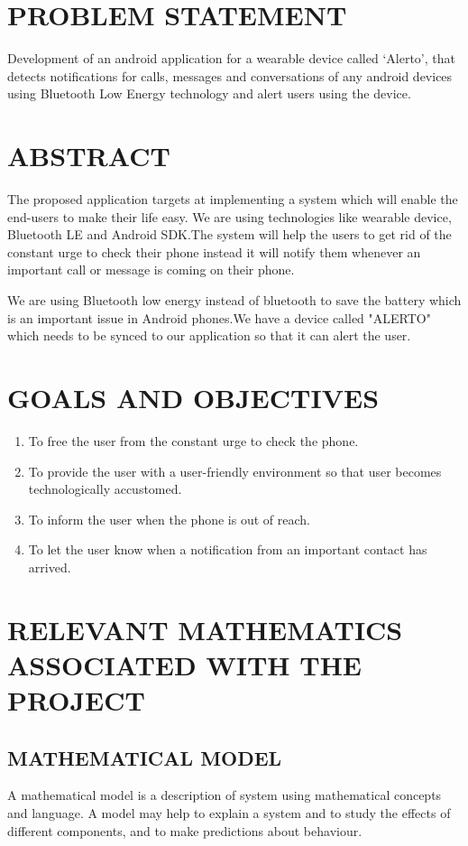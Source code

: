\documentclass[12pt,a4paper]{report}
\begin{document}
\section{PROBLEM STATEMENT} 
 Development of an android application for a wearable device called `Alerto', that detects notifications for calls, messages and conversations of any android devices  using Bluetooth Low Energy technology and alert users using the device.
 
\section{ABSTRACT}
The proposed application targets at implementing a system which will enable the end-users to make their life easy. We are using technologies like wearable device, Bluetooth LE and Android SDK.The system will help the users to get rid of the constant urge to check their phone instead it will notify them whenever an important call or message is coming on their phone.

We are using Bluetooth low energy instead of bluetooth to save the battery which is an important issue in Android phones.We have a device called "ALERTO" which needs to be synced to our application so that it can alert the user.

\section{GOALS AND OBJECTIVES}
\begin{enumerate}
	\item To free the user from the constant urge to check the phone.
	\item To provide the user with a user-friendly environment so that user becomes technologically accustomed.
	\item To inform the user when the phone is out of reach.
	\item To let the user know  when a notification from an important contact has arrived.
\end{enumerate}

\section{RELEVANT MATHEMATICS ASSOCIATED WITH THE PROJECT}
\subsection{MATHEMATICAL MODEL}
	A mathematical model is a description of system using mathematical concepts and language.  A model may help to explain a system and to study the effects of different components, and to make predictions about behaviour.
	
\end{document}
